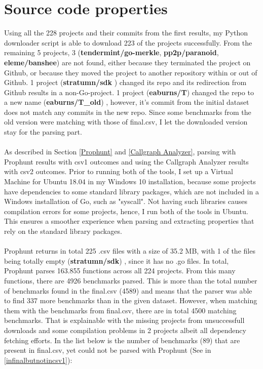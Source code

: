 \documentclass{seal_thesis}
\begin{document}
\section{Source code properties}
\label{Source code properties}

Using all the 228 projects and their commits from the first results, my Python downloader script is able to download 223 of the projects successfully. From the remaining 5 projects, 3 (\textbf{tendermint/go-merkle}, \textbf{pp2p/paranoid}, \textbf{eleme/banshee}) are not found, either because they terminated the project on Github, or because they moved the project to another repository within or out of Github. 1 project (\textbf{stratumn/sdk} \cite{stratumn/sdk}) changed its repo and its redirection from Github results in a non-Go-project. 1 project (\textbf{eaburns/T}) changed the repo to a new name (\textbf{eaburns/T\_old}) \cite{eaburns/T_old}, however, it's commit from the initial dataset does not match any commits in the new repo. Since some benchmarks from the old version were matching with those of final.csv, I let the downloaded version stay for the parsing part.\\
\\
As described in Section \ref{Prophunt} and \ref{Callgraph Analyzer}, parsing with Prophunt results with csv1 outcomes and using the Callgraph Analyzer results with csv2 outcomes. Prior to running both of the tools, I set up a Virtual Machine for Ubuntu 18.04 in my Windows 10 installation, because some projects have dependencies to some standard library packages, which are not included in a Windows installation of Go, such as "syscall". Not having such libraries causes compilation errors for some projects, hence, I run both of the tools in Ubuntu. This ensures a smoother experience when parsing and extracting properties that rely on the standard library packages.\\
\\
Prophunt returns in total 225 .csv files with a size of 35.2 MB, with 1 of the files being totally empty (\textbf{stratumn/sdk}) \cite{stratumn/sdk}, since it has no .go files. In total, Prophunt parses 163.855 functions across all 224 projects. From this many functions, there are 4926 benchmarks parsed. This is more than the total number of benchmarks found in the final.csv (4589) and means that the parser was able to find 337 more benchmarks than in the given dataset. However, when matching them with the benchmarks from final.csv, there are in total 4500 matching benchmarks. That is explainable with the missing projects from unsuccessfull downloads and some compilation problems in 2 projects albeit all dependency fetching efforts. In the list below is the number of benchmarks (89) that are present in final.csv, yet could not be parsed with Prophunt (See in \ref{infinalbutnotincsv1}):\\
\end{document}
